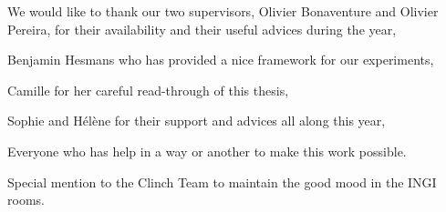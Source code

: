 \thispagestyle{empty}
\begin{vplace}
{\raggedleft
\begin{itshape}
We would like to thank our two supervisors, Olivier Bonaventure and Olivier Pereira, for their availability and their useful advices during the year,

Benjamin Hesmans who has provided a nice framework for our experiments,

Camille for her careful read-through of this thesis,

Sophie and Hélène for their support and advices all along this year,

Everyone who has help in a way or another to make this work possible.

Special mention to the Clinch Team to maintain the good mood in the INGI rooms.

\end{itshape}
}
\end{vplace}



